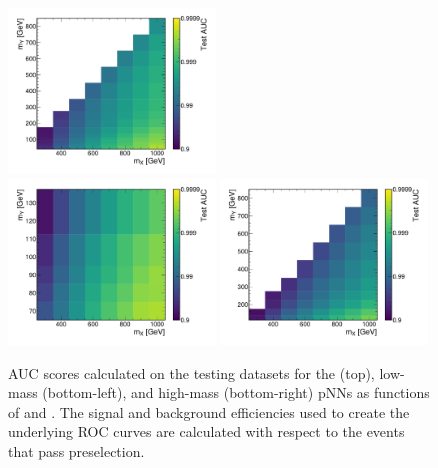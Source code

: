 \begin{figure}
    \centering
    \includegraphics[width=0.49\textwidth]{Figures/Dihiggs/categorisation/ROC/Y_tautau/auc.pdf} \\
    \includegraphics[width=0.49\textwidth]{Figures/Dihiggs/categorisation/ROC/Y_gg_Low_Mass/auc.pdf}
    \includegraphics[width=0.49\textwidth]{Figures/Dihiggs/categorisation/ROC/Y_gg_High_Mass/auc.pdf}
    \caption[AUC Scores for the \XYH pNNs]{AUC scores calculated on the testing datasets for the \XYttHgg (top), low-mass \XYggHtt (bottom-left), and high-mass \XYggHtt (bottom-right) pNNs as functions of \mX and \mY. The signal and background efficiencies used to create the underlying ROC curves are calculated with respect to the events that pass preselection.}\label{fig:xyh_auc}
\end{figure}

